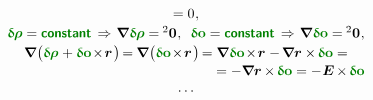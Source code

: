 \begin{equation*}
\begin{array}{c}
= 0 \hspace{.1ex} ,
\\[.2em]
%
\constvarvector{\hspace{-0.1ex}\bm{\rho}} = \boldconstant
\hspace{.4ex} \Rightarrow \hspace{.2ex}
\boldnabla \hspace{.1ex} \constvarvector{\hspace{-0.1ex}\bm{\rho}} =  \hspace{-0.12ex} {^2\bm{0}} \hspace{.1ex} ,
\;\:
\constvarvector{o} = \boldconstant
\hspace{.4ex} \Rightarrow \hspace{.2ex}
\boldnabla \hspace{.1ex} \constvarvector{o} = \hspace{-0.12ex} {^2\bm{0}} \hspace{.1ex} ,
\\[.2em]
%
\boldnabla \hspace{.1ex} \bigl(
\constvarvector{\hspace{-0.1ex}\bm{\rho}} \hspace{.1ex} +
\constvarvector{o} \hspace{-0.33ex} \times \hspace{-0.33ex} \currentlocationvector \hspace{.2ex} \bigr) \hspace{-0.25ex}
= \hspace{-0.1ex} \boldnabla \hspace{.1ex} \bigl(
\constvarvector{o} \hspace{-0.33ex} \times \hspace{-0.33ex} \currentlocationvector \hspace{.2ex} \bigr) \hspace{-0.25ex}
= \boldnabla \hspace{.1ex} \constvarvector{o} \hspace{-0.33ex} \times \hspace{-0.33ex} \currentlocationvector
\hspace{.1ex} - \hspace{-0.2ex}
\boldnabla \currentlocationvector \times \hspace{-0.2ex} \constvarvector{o} =
\\[.1em] %
\hspace*{\fill}
= - \boldnabla \currentlocationvector \hspace{-0.1ex} \times \hspace{-0.2ex} \constvarvector{o}
= - \hspace{.1ex} \UnitDyad \hspace{-0.16ex} \times \hspace{-0.2ex} \constvarvector{o}
\\[.2em]
%
\cdots
\end{array}
\end{equation*}

